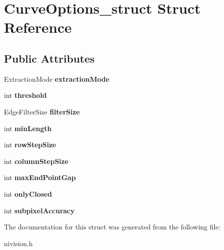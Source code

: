 \hypertarget{structCurveOptions__struct}{\section{\-Curve\-Options\-\_\-struct \-Struct \-Reference}
\label{structCurveOptions__struct}
}
\subsection*{\-Public \-Attributes}
\begin{DoxyCompactItemize}
\item 
\hypertarget{structCurveOptions__struct_a39376e85201b336a3a59210fba245be1}{\-Extraction\-Mode {\bfseries extraction\-Mode}}\label{structCurveOptions__struct_a39376e85201b336a3a59210fba245be1}

\item 
\hypertarget{structCurveOptions__struct_afa578a07d3513cef404480915a4a9755}{int {\bfseries threshold}}\label{structCurveOptions__struct_afa578a07d3513cef404480915a4a9755}

\item 
\hypertarget{structCurveOptions__struct_a0939696a7df263bd168b59a6fbefa329}{\-Edge\-Filter\-Size {\bfseries filter\-Size}}\label{structCurveOptions__struct_a0939696a7df263bd168b59a6fbefa329}

\item 
\hypertarget{structCurveOptions__struct_a8dc2326d107e295de4f724aba1e00cdb}{int {\bfseries min\-Length}}\label{structCurveOptions__struct_a8dc2326d107e295de4f724aba1e00cdb}

\item 
\hypertarget{structCurveOptions__struct_a9f5516501ff02c20254ad2070ccedc2c}{int {\bfseries row\-Step\-Size}}\label{structCurveOptions__struct_a9f5516501ff02c20254ad2070ccedc2c}

\item 
\hypertarget{structCurveOptions__struct_a21fe2c9c94c4bdd5933eb6ef660996f8}{int {\bfseries column\-Step\-Size}}\label{structCurveOptions__struct_a21fe2c9c94c4bdd5933eb6ef660996f8}

\item 
\hypertarget{structCurveOptions__struct_a1093624a04b69be9f2ea7d0175fe8146}{int {\bfseries max\-End\-Point\-Gap}}\label{structCurveOptions__struct_a1093624a04b69be9f2ea7d0175fe8146}

\item 
\hypertarget{structCurveOptions__struct_a89836fc36f1ec644bd054cafcd363a7a}{int {\bfseries only\-Closed}}\label{structCurveOptions__struct_a89836fc36f1ec644bd054cafcd363a7a}

\item 
\hypertarget{structCurveOptions__struct_aecfc6e953ab0a6541ebd98f860607f9a}{int {\bfseries subpixel\-Accuracy}}\label{structCurveOptions__struct_aecfc6e953ab0a6541ebd98f860607f9a}

\end{DoxyCompactItemize}


\-The documentation for this struct was generated from the following file\-:\begin{DoxyCompactItemize}
\item 
nivision.\-h\end{DoxyCompactItemize}
